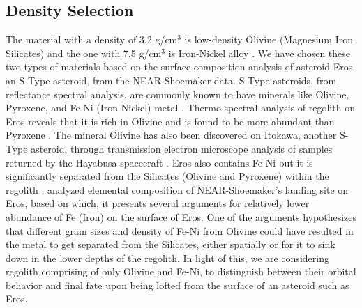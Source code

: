 \subsection{Density Selection}
\label{subsec:regolith_density_selection}
The material with a density of 3.2 g/cm$^3$ is low-density Olivine (Magnesium Iron Silicates) and the one with 7.5 g/cm$^3$ is Iron-Nickel alloy \parencite{passiveSorting}. We have chosen these two types of materials based on the surface composition analysis of asteroid Eros, an S-Type asteroid, from the \gls{NEAR}-Shoemaker data. S-Type asteroids, from reflectance spectral analysis, are commonly known to have minerals like Olivine, Pyroxene, and Fe-Ni (Iron-Nickel) metal \parencite{Nittler2001}. Thermo-spectral analysis of regolith on Eros reveals that it is rich in Olivine and is found to be more abundant than Pyroxene \parencite{McCoy2001}. The mineral Olivine has also been discovered on Itokawa, another S-Type asteroid, through transmission electron microscope analysis of samples returned by the Hayabusa spacecraft \parencite{olivineHayabusa}.
%
\newline\newline
%
Eros also contains Fe-Ni but it is significantly separated from the Silicates (Olivine and Pyroxene) within the regolith \parencite{Nittler2001}. \cite{Evans2001} analyzed elemental composition of \gls{NEAR}-Shoemaker's landing site on Eros, based on which, it presents several arguments for relatively lower abundance of Fe (Iron) on the surface of Eros. One of the arguments hypothesizes that different grain sizes and density of Fe-Ni from Olivine could have resulted in the metal to get separated from the Silicates, either spatially or for it to sink down in the lower depths of the regolith. In light of this, we are considering regolith comprising of only Olivine and Fe-Ni, to distinguish between their orbital behavior and final fate upon being lofted from the surface of an asteroid such as Eros.

